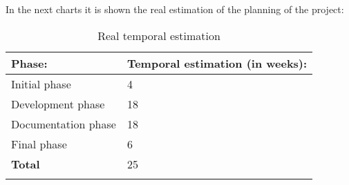 In the next charts it is shown the real estimation of the planning of the project:

\begin{table}[H]
  \begin{center}
    \begin{tabularx}{0.60\textwidth}{|X|X|}
      \firsthline
      \textbf{Phase:} & \textbf{Temporal estimation (in weeks):} \\
      \hline
      Initial phase & 4 \\
      \hline
      Development phase & 18 \\
      \hline
      Documentation phase & 18 \\
      \hline
      Final phase & 6 \\
      \hline
      \textbf{Total} & 25 \\
      \lasthline
    \end{tabularx}
    \caption{Real temporal estimation}
  \end{center}
\end{table}

\newpage
{}

\newpage
{}

